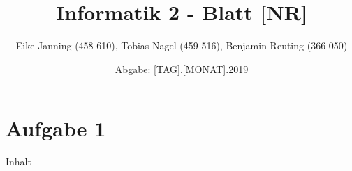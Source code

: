 \documentclass[11pt]{article}
\title{Informatik 2 - Blatt [NR]}
\author{Eike Janning (458 610), Tobias Nagel (459 516), Benjamin Reuting (366 050)}
\date{Abgabe: [TAG].[MONAT].2019}
\begin{document}
\maketitle

\section*{Aufgabe 1}

Inhalt
\end{document}
